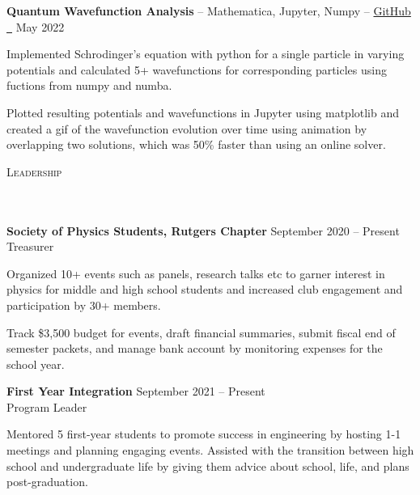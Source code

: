 \documentclass{article}
\newcommand{\header}[1]{{
\hspace*{0pt}\vspace*{6pt} \textsc{#1}} \vspace*{-6pt} 
\lineunder
}
\newcommand{\lineunder}{
\vspace*{-8pt} \\ \hspace*{-3pt} 
\hrulefill \\
}
\newcommand{\employer}[4]{{
\vspace*{2pt}%
\textbf{#1} #2 \hfill #3\\ #4 \vspace*{2pt}}
}
\newcommand{\project}[3]{{
\vspace*{2pt}%
\textbf{#1} #2 \hfill #3\vspace*{2pt}}
}
\renewcommand{\labelitemii}{
$\vcenter{\hbox{\tiny$\bullet$}}$\hspace*{-3pt}
}
\newenvironment{bullet-list-minor}{
\begin{list}{\labelitemii}{\setlength\leftmargin{15pt} 
\topsep 0pt \itemsep -2pt}}{\vspace*{4pt}\end{list}
}
\begin{document}
    \project{Quantum Wavefunction Analysis}{--  Mathematica, Jupyter, Numpy -- \href{https://github.com/akhilvreddy/Quantum-Wavefunction-Analysis}{GitHub \faGithub\ }}{May 2022}
	\begin{bullet-list-minor}
	\item Implemented Schrodinger's equation with python for a single particle in varying potentials and calculated 5+ wavefunctions for corresponding particles using fuctions from numpy and numba. 
	\item Plotted resulting potentials and wavefunctions in Jupyter using matplotlib and created a gif of the wavefunction evolution over time using animation by overlapping two solutions, which was 50\% faster than using an online solver.
    \end{bullet-list-minor}



\vspace*{4pt}%
\header{Leadership}
    \employer{Society of Physics Students, Rutgers Chapter}
    {}{September 2020 -- Present}{Treasurer}
	\begin{bullet-list-minor}
    \item Organized 10+ events such as panels, research talks etc to garner interest in physics for middle and high school students and increased club engagement and participation by 30+ members.
    \item Track \$3,500 budget for events, draft financial summaries, submit fiscal end of semester packets, and manage bank account by monitoring expenses for the school year.
    \end{bullet-list-minor}
    \employer{First Year Integration}
    {}{September 2021 -- Present}{Program Leader}
    \begin{bullet-list-minor}
    \item Mentored 5 first-year students to promote success in engineering by hosting 1-1 meetings and planning engaging events. Assisted with the transition between high school and undergraduate life by giving them advice about school, life, and plans post-graduation.  
    \end{bullet-list-minor}
\end{document}
